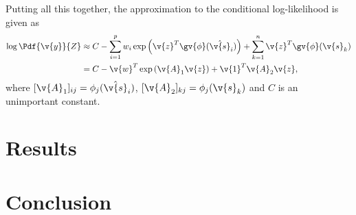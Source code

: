 \documentclass[12pt,a4paper,oneside,article]{memoir}
\begin{document}
Putting all this together, the approximation to the conditional log-likelihood is given
as
\begin{align}
	\log\Pdf{\v{y}}{Z}&\approx C-\sum_{i=1}^p w_i \exp\left(\v{z}^T\gv{\phi}(\hat{\v{s}}_i)\right)+
	\sum_{k=1}^n \v{z}^T\gv{\phi}(\v{s}_k)\\
	&=C-\v{w}^T\exp\left(\v{A}_1\v{z}\right)+\v{1}^T\v{A}_2\v{z},
	\label{eq:likelihood_approximation}
\end{align}
where $[\v{A}_1]_{ij}=\phi_j(\hat{\v{s}}_i)$, $[\v{A}_2]_{kj}=\phi_j(\v{s}_k)$ and
$C$ is an unimportant constant. 

  

\section{Results}

\section{Conclusion}

\printbibliography
\clearpage
\end{document}
